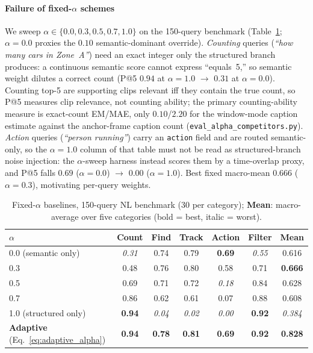 ﻿\documentclass[conference]{IEEEtran}
\theoremstyle{plain}
\begin{document}
\paragraph*{Failure of fixed-\texorpdfstring{$\alpha$}{alpha} schemes}
We sweep $\alpha\in\{0.0,\allowbreak 0.3,\allowbreak 0.5,\allowbreak 0.7,\allowbreak 1.0\}$ on the 150-query benchmark (Table~\ref{tab:alpha_baseline}; $\alpha{=}0.0$ proxies the $0.10$ semantic-dominant override). \emph{Counting} queries (\textit{``how many cars in Zone~A''}) need an exact integer only the structured branch produces: a continuous semantic score cannot express ``equals~5,'' so semantic weight dilutes a correct count (P@5 $0.94$ at $\alpha{=}1.0$ $\to$ $0.31$ at $\alpha{=}0.0$). Counting top-5 are supporting clips relevant iff they contain the true count, so P@5 measures clip relevance, not counting ability; the primary counting-ability measure is exact-count EM/MAE, only $0.10$/$2.20$ for the window-mode caption estimate against the anchor-frame caption count (\texttt{eval\_\allowbreak alpha\_\allowbreak competitors.py}). \emph{Action} queries (\textit{``person running''}) carry an \texttt{action} field and are routed semantic-only, so the $\alpha{=}1.0$ column of that table must not be read as structured-branch noise injection: the $\alpha$-sweep harness instead scores them by a time-overlap proxy, and P@5 falls $0.69$ ($\alpha{=}0.0$) $\to$ $0.00$ ($\alpha{=}1.0$). Best fixed macro-mean $0.666$ ($\alpha{=}0.3$), motivating per-query weights. 

\begin{table}[!t]
\caption{Fixed-$\alpha$ baselines, 150-query NL benchmark (30 per category); \textbf{Mean}: macro-average over five categories (bold = best, italic = worst).}
\label{tab:alpha_baseline}
\centering
\footnotesize
\begin{tabular}{@{}lcccccc@{}}
\toprule
$\alpha$ & Count & Find & Track & Action & Filter & Mean \\
\midrule
0.0 (semantic only) & \emph{0.31} & 0.74 & 0.79 & \textbf{0.69} & \emph{0.55} & 0.616 \\
0.3 & 0.48 & 0.76 & 0.80 & 0.58 & 0.71 & \textbf{0.666} \\
0.5 & 0.69 & 0.71 & 0.72 & \emph{0.18} & 0.84 & 0.628 \\
0.7 & 0.86 & 0.62 & 0.61 & 0.07 & 0.88 & 0.608 \\
1.0 (structured only) & \textbf{0.94} & \emph{0.04} & \emph{0.02} & \emph{0.00} & \textbf{0.92} & \emph{0.384} \\
\midrule
\textbf{Adaptive} (Eq.~\eqref{eq:adaptive_alpha}) & \textbf{0.94} & \textbf{0.78} & \textbf{0.81} & \textbf{0.69} & \textbf{0.92} & \textbf{0.828} \\
\bottomrule
\end{tabular}
\end{table}
\end{document}
